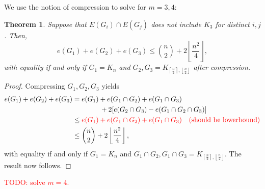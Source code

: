 \documentclass[a4paper]{article}
\newtheorem{theorem}{Theorem}[section]
\begin{document}
  We use the notion of compression to solve for $m = 3, 4$:
  \begin{theorem}
    Suppose that $E(G_i) \cap E(G_j)$ does not include $K_3$ for distinct $i, j$. Then,
    \[
      e(G_1) + e(G_2) + e(G_3) \leq \binom{n}{2} + 2\left\lfloor\frac{n^2}{4}\right\rfloor,
    \]
    with equality if and only if $G_1 = K_n$ and $G_2, G_3 = K_{\left\lceil\frac{n}{2}\right\rceil,
    \left\lfloor\frac{n}{2}\right\rfloor}$ after compression.
  \end{theorem}

  \begin{proof}
    Compressing $G_1, G_2, G_3$ yields
    \begin{align*}
      e(G_1) + e(G_2) + e(G_3) 
      &= e(G_1) + e(G_1 \cap G_2) + e(G_1 \cap G_3) \\
      &\qquad\qquad + 2[e(G_2 \cap G_3) - e(G_1 \cap G_2 \cap G_3)] \\
      &\leq \textcolor{red}{e(G_1) + e(G_1 \cap G_2) + e(G_1 \cap G_3) \quad \text{(should be lowerbound)}} \\
      &\leq \binom{n}{2} + 2\left\lfloor\frac{n^2}{4}\right\rfloor,
    \end{align*}
    with equality if and only if $G_1 = K_n$ and $G_1 \cap G_2, G_1 \cap G_3 =
    K_{\left\lceil\frac{n}{2}\right\rceil, \left\lfloor\frac{n}{2}\right\rfloor}$. The result now
    follows.
  \end{proof}

  \textcolor{red}{TODO: solve $m = 4$.}


\end{document}
